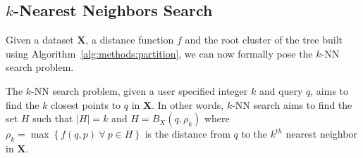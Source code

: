 



\subsection{\texorpdfstring{$k$}{k}-Nearest Neighbors Search}
\label{sec:methods:knn-search}

Given a dataset $\textbf{X}$, a distance function $f$ and the root cluster of the tree built using Algorithm~\ref{alg:methods:partition}, we can now formally pose the $k$-NN search problem.

The $k$-NN search problem, given a user specified integer $k$ and query $q$, aims to find the $k$ closest points to $q$ in $\textbf{X}$.
In other words, $k$-NN search aims to find the set $H$ such that $|H| = k$ and $H = B_X(q, \rho_k)$ where $\rho_k = \max \left\{ f(q, p) \ \forall \ p \in H \right\}$ is the distance from $q$ to the $k^{th}$ nearest neighbor in $\textbf{X}$.

